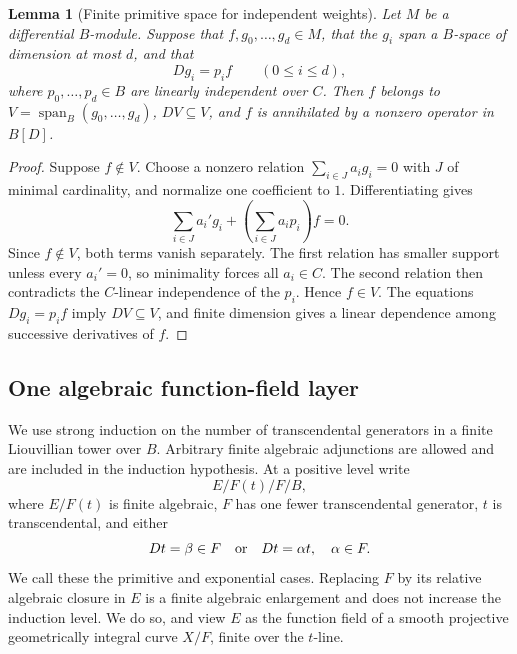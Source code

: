 \documentclass[11pt,a4paper]{article}
\newtheorem{lemma}[theorem]{Lemma}
\theoremstyle{definition}
\theoremstyle{remark}
\numberwithin{equation}{section}
\begin{document}

\begin{lemma}[Finite primitive space for independent weights]
\label{stab:finite-space}
Let $M$ be a differential $B$-module.  Suppose that
$f,g_0,\ldots,g_d\in M$, that the $g_i$ span a $B$-space of
dimension at most $d$, and that
\[
 Dg_i=p_i f\qquad(0\leq i\leq d),
\]
where $p_0,\ldots,p_d\in B$ are linearly independent over $C$.
Then $f$ belongs to $V=\operatorname{span}_B(g_0,\ldots,g_d)$,
$DV\subseteq V$, and $f$ is annihilated by a nonzero operator in
$B[D]$.
\end{lemma}
\begin{proof}
Suppose $f\notin V$.  Choose a nonzero relation
$\sum_{i\in J}a_i g_i=0$ with $J$ of minimal cardinality, and
normalize one coefficient to $1$.  Differentiating gives
\[
 \sum_{i\in J}a_i'g_i+
 \left(\sum_{i\in J}a_i p_i\right)f=0.
\]
Since $f\notin V$, both terms vanish separately.  The first relation
has smaller support unless every $a_i'=0$, so minimality forces all
$a_i\in C$.  The second relation then contradicts the $C$-linear
independence of the $p_i$.  Hence $f\in V$.  The equations
$Dg_i=p_if$ imply $DV\subseteq V$, and finite dimension gives a
linear dependence among successive derivatives of $f$.
\end{proof}


\subsection{One algebraic function-field layer}

We use strong induction on the number of transcendental generators in a
finite Liouvillian tower over $B$.  Arbitrary finite algebraic
adjunctions are allowed and are included in the induction hypothesis.
At a positive level write
\begin{equation}\label{stab:layer}
 E/F(t)/F/B,
\end{equation}
where $E/F(t)$ is finite algebraic, $F$ has one fewer transcendental
generator, $t$ is transcendental, and either
\[
 Dt=\beta\in F\quad\hbox{or}\quad Dt=\alpha t,\quad\alpha\in F.
\]
We call these the primitive and exponential cases.  Replacing $F$ by
its relative algebraic closure in $E$ is a finite algebraic enlargement
and does not increase the induction level.  We do so, and view $E$ as
the function field of a smooth projective geometrically integral curve
$X/F$, finite over the $t$-line.
\end{document}
